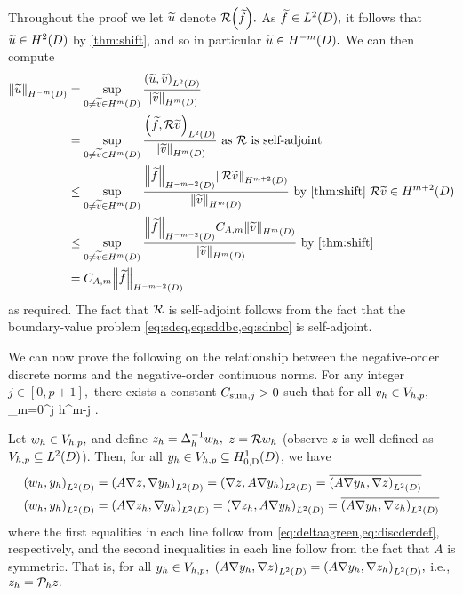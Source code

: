 Throughout the proof we let $\widetilde{u}$ denote $\DeltaAI\mleft(\ftilde\mright).$ As $\ftilde \in \LtD,$ it follows that $\utilde \in \HtD$ by \cref{thm:shift}, and so in particular $\utilde \in \HmmD.$ We can then compute
\begin{align*}
\NHmmD{\utilde} &= \sup_{0 \neq \vtilde \in \HmD} \frac{\IPLtD{\utilde}{\vtilde}}{\NHmD{\vtilde}}\\
&= \sup_{0 \neq \vtilde \in \HmD} \frac{\IPLtD{\ftilde}{\DeltaAI\vtilde}}{\NHmD{\vtilde}}\text{ as } \DeltaAI \text{ is self-adjoint}\\
&\leq \sup_{0 \neq \vtilde \in \HmD} \frac{\NHmmmtD{\ftilde}\NHmptD{\DeltaAI\vtilde}}{\NHmD{\vtilde}} \text{ by \cref{thm:shift} } \DeltaAI\vtilde \in \HmptD\\
&\leq \sup_{0 \neq \vtilde \in \HmD} \frac{\NHmmmtD{\ftilde}\CAm\NHmD{\vtilde}}{\NHmD{\vtilde}} \text{ by \cref{thm:shift}}\\
&= \CAm \NHmmmtD{\ftilde}
\end{align*}
as required. The fact that $\mathcal R$ is self-adjoint follows from the fact that the boundary-value problem \cref{eq:sdeq,eq:sddbc,eq:sdnbc} is self-adjoint.%
\epf

We can now prove the following  on the relationship between the negative-order discrete norms and the negative-order continuous norms.
\label{lem:negdiscsum}
For any integer $j \in [0,p+1],$ there exists a constant $C_{\mathrm{sum},j} > 0$ such that for all $v_{h} \in V_{h,p},$
\beqs
\Nmjh{\vh} \leq \Csumj \sum_{m=0}^j h^{m-j} \NHmmD{\vh}.
\eeqs
\ele

Let $w_{h} \in V_{h,p},$ and define $z_{h} = \Delta_{h}^{-1} w_{h},$ $z = \mathcal R w_{h}$ (observe $z$ is well-defined as $\Vhp \subseteq \LtD$). Then, for all $\yh \in \Vhp \subseteq \HozDD$, we have
\begin{align*}
\IPLtD{\wh}{\yh} &= \IPLtD{A \grad z}{\grad \yh} = \IPLtD{\grad z}{A\grad \yh} = \overline{\IPLtD{A\grad \yh}{\grad z}} \\
\IPLtD{\wh}{\yh} &= \IPLtD{A \grad \zh}{\grad \yh} = \IPLtD{\grad \zh}{A\grad \yh} = \overline{\IPLtD{A\grad \yh}{\grad \zh}}
\end{align*}
where the first equalities in each line follow from \cref{eq:deltaagreen,eq:discderdef}, respectively, and the second inequalities in each line follow from the fact that $A$ is symmetric. That is, for all $y_{h} \in V_{h,p},$ $\IPLtD{A\grad \yh}{\grad z} = \IPLtD{A\grad \yh}{\grad \zh},$ i.e., $z_{h} = \mathcal P_{h} z.$

